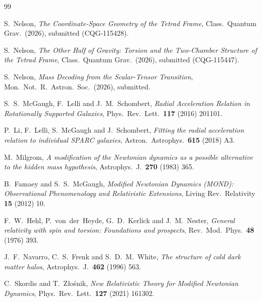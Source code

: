 \documentclass[twocolumn]{iopjournal}
\begin{document}
\begin{thebibliography}{99}

S.~Nelson,
\textit{The Coordinate-Space Geometry of the Tetrad Frame},
Class.\ Quantum Grav.\ (2026), submitted (CQG-115428).

S.~Nelson,
\textit{The Other Half of Gravity: Torsion and the
Two-Chamber Structure of the Tetrad Frame},
Class.\ Quantum Grav.\ (2026), submitted (CQG-115447).

S.~Nelson,
\textit{Mass Decoding from the Scalar-Tensor Transition},
Mon.\ Not.\ R.\ Astron.\ Soc.\ (2026), submitted.

S.~S.~McGaugh, F.~Lelli and J.~M.~Schombert,
\textit{Radial Acceleration Relation in Rotationally
Supported Galaxies},
Phys.\ Rev.\ Lett.\ \textbf{117} (2016) 201101.

P.~Li, F.~Lelli, S.~McGaugh and J.~Schombert,
\textit{Fitting the radial acceleration relation to
individual SPARC galaxies},
Astron.\ Astrophys.\ \textbf{615} (2018) A3.

M.~Milgrom,
\textit{A modification of the Newtonian dynamics as a
possible alternative to the hidden mass hypothesis},
Astrophys.\ J.\ \textbf{270} (1983) 365.

B.~Famaey and S.~S.~McGaugh,
\textit{Modified Newtonian Dynamics (MOND): Observational
Phenomenology and Relativistic Extensions},
Living Rev.\ Relativity \textbf{15} (2012) 10.

F.~W.~Hehl, P.~von~der~Heyde, G.~D.~Kerlick and
J.~M.~Nester,
\textit{General relativity with spin and torsion:
Foundations and prospects},
Rev.\ Mod.\ Phys.\ \textbf{48} (1976) 393.

J.~F.~Navarro, C.~S.~Frenk and S.~D.~M.~White,
\textit{The structure of cold dark matter halos},
Astrophys.\ J.\ \textbf{462} (1996) 563.

C.~Skordis and T.~Z\l{}o\'{s}nik,
\textit{New Relativistic Theory for Modified Newtonian
Dynamics},
Phys.\ Rev.\ Lett.\ \textbf{127} (2021) 161302.

\end{thebibliography}
\end{document}

